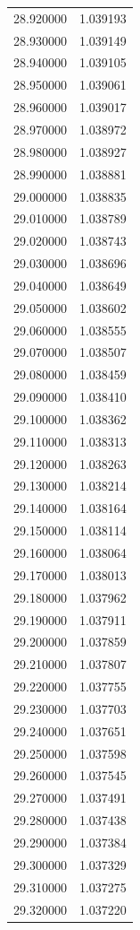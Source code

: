 \begin{tabular}{rr}
28.920000 & 1.039193 \\
28.930000 & 1.039149 \\
28.940000 & 1.039105 \\
28.950000 & 1.039061 \\
28.960000 & 1.039017 \\
28.970000 & 1.038972 \\
28.980000 & 1.038927 \\
28.990000 & 1.038881 \\
29.000000 & 1.038835 \\
29.010000 & 1.038789 \\
29.020000 & 1.038743 \\
29.030000 & 1.038696 \\
29.040000 & 1.038649 \\
29.050000 & 1.038602 \\
29.060000 & 1.038555 \\
29.070000 & 1.038507 \\
29.080000 & 1.038459 \\
29.090000 & 1.038410 \\
29.100000 & 1.038362 \\
29.110000 & 1.038313 \\
29.120000 & 1.038263 \\
29.130000 & 1.038214 \\
29.140000 & 1.038164 \\
29.150000 & 1.038114 \\
29.160000 & 1.038064 \\
29.170000 & 1.038013 \\
29.180000 & 1.037962 \\
29.190000 & 1.037911 \\
29.200000 & 1.037859 \\
29.210000 & 1.037807 \\
29.220000 & 1.037755 \\
29.230000 & 1.037703 \\
29.240000 & 1.037651 \\
29.250000 & 1.037598 \\
29.260000 & 1.037545 \\
29.270000 & 1.037491 \\
29.280000 & 1.037438 \\
29.290000 & 1.037384 \\
29.300000 & 1.037329 \\
29.310000 & 1.037275 \\
29.320000 & 1.037220 \\

\end{tabular}
